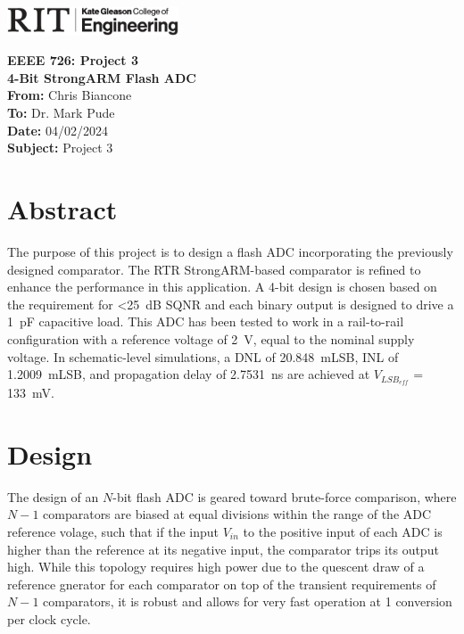 \documentclass[11pt,letterpaper]{article}
\begin{document}
\VerbatimFootnotes %


	\hspace{4.5in}
	\includegraphics[width=2in,trim=0cm 0in 0in 0.0in,clip]{kgcoelogo2019horiz.eps}
\newline

\Huge\textbf{EEEE 726: Project 3 \\4-Bit StrongARM Flash ADC}\\

\Large
\textbf{From:} Chris Biancone \\
\textbf{To: } Dr. Mark Pude \\
\textbf{Date: } 04/02/2024 \\
\textbf{Subject: } Project 3\\
\vspace{0.5in}

\section*{Abstract}
\normalsize
The purpose of this project is to design a flash ADC incorporating the previously designed comparator. The RTR StrongARM-based comparator is refined to enhance the performance in this application. A 4-bit design is chosen based on the requirement for <\qty{25}{\dB} SQNR and each binary output is designed to drive a \qty{1}{\pF} capacitive load. This ADC has been tested to work in a rail-to-rail configuration with a reference voltage of \qty{2}{\V}, equal to the nominal supply voltage. In schematic-level simulations, a DNL of \qty{20.848}{mLSB}, INL of \qty{1.2009}{mLSB}, and propagation delay of \qty{2.7531}{\ns} are achieved at \(V_{LSB_{eff}}\) = \qty{133}{\mV}.

\section{Design}

The design of an \(N\)-bit flash ADC is geared toward brute-force comparison, where \(N-1\) comparators are biased at equal divisions within the range of the ADC reference volage, such that if the input \(V_{in}\) to the positive input of each ADC is higher than the reference at its negative input, the comparator trips its output high. While this topology requires high power due to the quescent draw of a reference gnerator for each comparator on top of the transient requirements of \(N-1\) comparators, it is robust and allows for very fast operation at 1 conversion per clock cycle.
\end{document}
